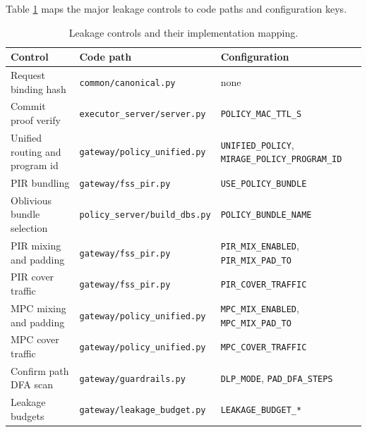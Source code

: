 Table \ref{tab:leakmap} maps the major leakage controls to code paths and configuration keys.

\begin{table}[t]
\centering
\small
\begin{tabular}{lll}
\toprule
Control & Code path & Configuration \\
\midrule
Request binding hash & \texttt{common/canonical.py} & none \\
Commit proof verify & \texttt{executor\_server/server.py} & \texttt{POLICY\_MAC\_TTL\_S} \\
Unified routing and program id & \texttt{gateway/policy\_unified.py} & \texttt{UNIFIED\_POLICY}, \texttt{MIRAGE\_POLICY\_PROGRAM\_ID} \\
PIR bundling & \texttt{gateway/fss\_pir.py} & \texttt{USE\_POLICY\_BUNDLE} \\
Oblivious bundle selection & \texttt{policy\_server/build\_dbs.py} & \texttt{POLICY\_BUNDLE\_NAME} \\
PIR mixing and padding & \texttt{gateway/fss\_pir.py} & \texttt{PIR\_MIX\_ENABLED}, \texttt{PIR\_MIX\_PAD\_TO} \\
PIR cover traffic & \texttt{gateway/fss\_pir.py} & \texttt{PIR\_COVER\_TRAFFIC} \\
MPC mixing and padding & \texttt{gateway/policy\_unified.py} & \texttt{MPC\_MIX\_ENABLED}, \texttt{MPC\_MIX\_PAD\_TO} \\
MPC cover traffic & \texttt{gateway/policy\_unified.py} & \texttt{MPC\_COVER\_TRAFFIC} \\
Confirm path DFA scan & \texttt{gateway/guardrails.py} & \texttt{DLP\_MODE}, \texttt{PAD\_DFA\_STEPS} \\
Leakage budgets & \texttt{gateway/leakage\_budget.py} & \texttt{LEAKAGE\_BUDGET\_*} \\
\bottomrule
\end{tabular}
\caption{Leakage controls and their implementation mapping.}
\label{tab:leakmap}
\end{table}

